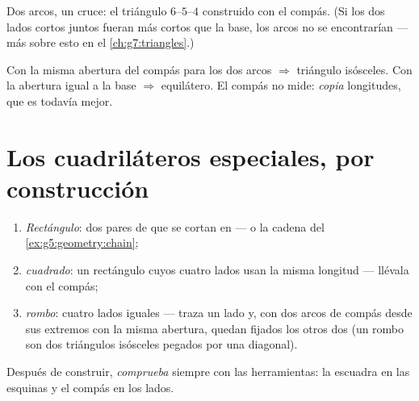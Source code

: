 \begin{omfigure}

{\small Dos arcos, un cruce: el triángulo $6$--$5$--$4$ construido con
el compás. (Si los dos lados cortos juntos fueran más cortos que la
base, los arcos no se encontrarían --- más sobre esto en el
\cref{ch:g7:triangles}.)}
\end{omfigure}

\begin{example}\label{ex:g5:geometry:special}
Con la misma abertura del compás para los dos arcos $\Rightarrow$ triángulo isósceles.
Con la abertura igual a la base $\Rightarrow$ equilátero. El compás
no mide: \emph{copia} longitudes, que es todavía mejor.
\end{example}

\section{Los cuadriláteros especiales, por construcción}

\begin{method}\label{met:g5:geometry:quadrilaterals}
\begin{enumerate}
  \item \emph{Rectángulo}: dos pares de  que se cortan en  --- o la cadena del \cref{ex:g5:geometry:chain};
  \item \emph{cuadrado}: un rectángulo cuyos cuatro lados usan la misma
        longitud --- llévala con el compás;
  \item \emph{rombo}: cuatro lados iguales --- traza un lado y, con dos
        arcos de compás desde sus extremos con la misma abertura, quedan fijados
        los otros dos  (un rombo son dos triángulos isósceles
        pegados por una diagonal).
\end{enumerate}
Después de construir, \emph{comprueba} siempre con las herramientas: la escuadra en
las esquinas y el compás en los lados.
\end{method}

